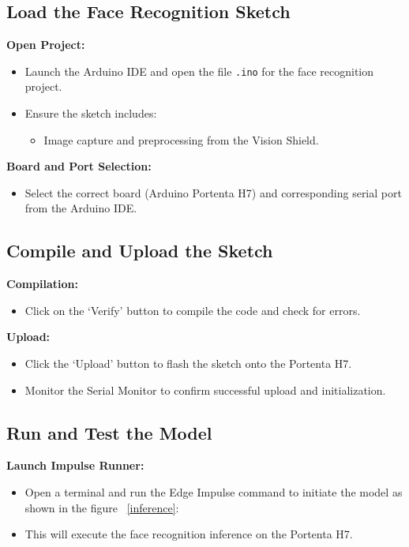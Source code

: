 \subsection{Load the Face Recognition Sketch}

\textbf{Open Project:}  
\begin{itemize}[leftmargin=1.5cm]
	\item Launch the Arduino IDE and open the file \texttt{.ino} for the face recognition project.
	\item Ensure the sketch includes:
	\begin{itemize}
		\item Image capture and preprocessing from the Vision Shield.
	\end{itemize}
\end{itemize}

\textbf{Board and Port Selection:}  
\begin{itemize}[leftmargin=1.5cm]
	\item Select the correct board (Arduino Portenta H7) and corresponding serial port from the Arduino IDE.
\end{itemize}

\subsection{Compile and Upload the Sketch}

\textbf{Compilation:}  
\begin{itemize}[leftmargin=1.5cm]
	\item Click on the ‘Verify’ button to compile the code and check for errors.
\end{itemize}

\textbf{Upload:}  
\begin{itemize}[leftmargin=1.5cm]
	\item Click the ‘Upload’ button to flash the sketch onto the Portenta H7.
	\item Monitor the Serial Monitor to confirm successful upload and initialization.
\end{itemize}

\subsection{Run and Test the Model}

\textbf{Launch Impulse Runner:}  
\begin{itemize}[leftmargin=1.5cm]
	\item Open a terminal and run the Edge Impulse command to initiate the model as shown in the figure ~\ref{inference}:  
	 \\   
	\item This will execute the face recognition inference on the Portenta H7.
\end{itemize}

